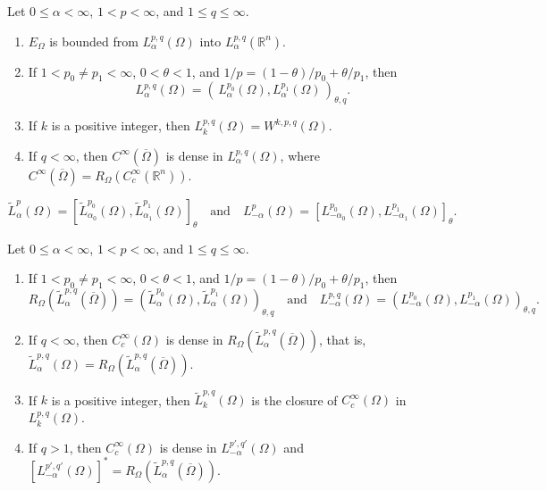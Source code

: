 \documentclass[10pt,a4paper]{amsart}
\newcommand{\R}{{\mathbb{R}}}
\begin{document}
\begin{lem}\label{interp for SL on domains} Let $0 \le   \alpha  <\infty$, $1< p <\infty$, and $ 1\le q  \le \infty$.
\begin{enumerate}[{\upshape (i)}]
\item $E_\Omega$ is bounded from $L_\alpha^{p,q}(\Omega )$ into $L_\alpha^{p,q}(\R^n )$.
\item  If      $1< p_0 \neq p_1 < \infty$, $0<\theta < 1$, and $1/p=(1-\theta)/p_0 +\theta/p_1$,    then
    $$
    L_\alpha^{p,q}(\Omega ) = \left(\,  L_\alpha^{p_0}(\Omega ) , L_\alpha^{p_1}(\Omega ) \, \right)_{\theta,q}   .
    $$
\item     If $k$ is a positive integer, then $L_k^{p,q}(\Omega ) =W^{k,p,q}(\Omega )$.
\item  If   $q<\infty$, then  $C^\infty (\overline{\Omega}) $ is dense in $L_\alpha^{p,q}(\Omega )$, where $C^\infty (\overline{\Omega}) =R_\Omega \left(C_c^\infty (\R^n ) \right)$.
\end{enumerate}
\end{lem}

\begin{equation}\label{comp-interp-S on domains}
\widetilde{L}_{\alpha}^{p} (\Omega )  = \left[\widetilde{L}_{\alpha_0}^{p_0} (\Omega ) ,\widetilde{L}_{\alpha_1}^{p_1} (\Omega ) \right]_{\theta} \quad\mbox{and}\quad L_{-\alpha}^{p} (\Omega )  =   \left[ L_{-\alpha_0}^{p_0} (\Omega ) ,L_{-\alpha_1}^{p_1} (\Omega ) \right]_{\theta}.
\end{equation}

\begin{lem}\label{real-interp-S on domains} Let $0 \le   \alpha  <\infty$, $1< p  < \infty$,  and $ 1\le q  \le \infty$.
\begin{enumerate}[{\upshape (i)}]
\item  If      $1< p_0 \neq p_1 < \infty$, $0<\theta < 1$, and $1/p=(1-\theta)/p_0 +\theta/p_1$,    then
    \[
 R_\Omega  (\widetilde{L}_\alpha^{p,q} (\overline{\Omega} ) )  = \left( \widetilde{L}_\alpha^{p_0}(\Omega ) ,\widetilde{L}_\alpha^{p_1}(\Omega ) \right)_{\theta,q}
\quad\mbox{and}\quad
     L_{-\alpha}^{p,q} (\Omega )   = \left( L_{-\alpha}^{p_0} (\Omega ) ,L_{-\alpha}^{p_1} (\Omega ) \right)_{\theta,q}.
\]
\item If   $q<\infty$, then  $C_c^\infty (\Omega) $ is dense in $R_\Omega  (\widetilde{L}_\alpha^{p,q} (\overline{\Omega} ) )$, that is,   $\widetilde{L}_\alpha^{p,q}(\Omega )= R_\Omega  (\widetilde{L}_\alpha^{p,q} (\overline{\Omega} ) )$.
\item If  $k$ is  a positive integer, then $\widetilde{L}_k^{p,q}(\Omega ) $ is the closure of $C_c^\infty (\Omega) $ in $L_k^{p,q}(\Omega )$.
\item If $q>1$, then $C_c^\infty (\Omega )$ is dense in $L_{-\alpha}^{p',q'} (\Omega ) $ and $ \left[ L_{-\alpha}^{p', q'}(\Omega ) \right]^* = R_\Omega  (\widetilde{L}_\alpha^{p,q} (\overline{\Omega} ) )$.
\end{enumerate}
\end{lem}
\end{document}
